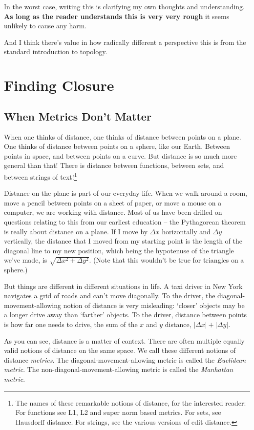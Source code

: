 \documentclass{report}
\begin{document}
In the worst case, writing this is clarifying my own thoughts and understanding. {\bf As long as the reader understands this is very very rough} it seems unlikely to cause any harm.

And I think there's value in how radically different a perspective this is from the standard introduction to topology.

\chapter{Finding Closure}

\section{When Metrics Don't Matter}

When one thinks of distance, one thinks of distance between points on a plane. One thinks of distance between points on a sphere, like our Earth. Between points in space, and between points on a curve. But distance is so much more general than that! There is distance between functions, between sets, and between strings of text!\footnote{The names of these remarkable notions of distance, for the interested reader: For functions see L1, L2 and super norm based metrics. For sets, see Hausdorff distance. For strings, see the various versions of edit distance.}

Distance on the plane is part of our everyday life. When we walk around a room, move a pencil between points on a sheet of paper, or move a mouse on a computer, we are working with distance. Most of us have been drilled on questions relating to this from our earliest education -- the Pythagorean theorem is really about distance on a plane. If I move by $Δx$ horizontally and $Δy$ vertically, the distance that I moved from my starting point is the length of the diagonal line to my new position, which being the hypotenuse of the triangle we've made, is $\sqrt{Δx^2 + Δy^2}$. (Note that this wouldn't be true for triangles on a sphere.)

But things are different in different situations in life. A taxi driver in New York navigates a grid of roads and can't move diagonally. To the driver, the diagonal-movement-allowing notion of distance is very misleading: `closer' objects may be a longer drive away than `farther' objects. To the driver, distance between points is how far one needs to drive, the sum of the $x$ and $y$ distance, $|Δx| + |Δy|$.

As you can see, distance is a matter of context. There are often multiple equally valid notions of distance on the same space. We call these different notions of distance \emph{metrics}. The diagonal-movement-allowing metric is called the \emph{Euclidean metric}. The non-diagonal-movement-allowing metric is called the \emph{Manhattan metric}.
\end{document}

